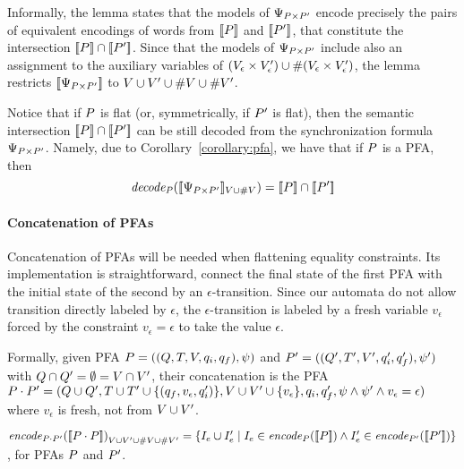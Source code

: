 \documentclass[sigplan,review,anonymous]{acmart}\settopmatter{printfolios=true,printccs=false,printacmref=false}
\begin{document}
Informally, the lemma states that the models of $\Psi_{P \times P'}$ encode precisely the pairs of equivalent encodings of words from $[\![P]\!]$ and $[\![P']\!]$, that constitute the intersection $[\![P]\!] \cap [\![P']\!]$. 
Since that the models of $\Psi_{P \times P'}$ include also an assignment to the auxiliary variables of $(V_\epsilon\times V'_\epsilon) \cup \#{(V_\epsilon\times V'_\epsilon)}$, the lemma restricts $[\![\Psi_{P \times P'}]\!]$ to ${V\cup V' \cup \#{V}\cup\#{V'}}$. 

Notice that if $P$ is flat (or, symmetrically, if $P'$ is flat), then the semantic intersection $[\![P]\!] \cap [\![P']\!]$ can be still decoded from the synchronization formula $\Psi_{P \times P'}$. 
Namely, due to Corollary~\ref{corollary:pfa}, we have that if $P$ is a PFA, then
$$
\mathit{decode_{P}} ([\![\Psi_{P \times P'}]\!]_{V\cup \#{V}}) = [\![P]\!] \cap [\![P']\!]
$$  

\paragraph{Concatenation of PFAs}
Concatenation of PFAs will be needed when flattening equality constraints. Its implementation is straightforward, connect the final state of the first PFA with the initial state of the second by an $\epsilon$-transition. Since our automata do not allow transition directly labeled by $\epsilon$, 
the $\epsilon$-transition is labeled by a fresh variable $v_\epsilon$ forced by the constraint $v_\epsilon = \epsilon$ to take the value $\epsilon$.  

Formally, given PFA $P = ((Q,T,V,q_i,q_f),\psi)$ and ${P'} = ((Q',T',V',q_i',q_f'),\psi')$ with $Q\cap Q'=\emptyset = V\cap V'$, 
their concatenation is the PFA $P\cdot P' = (Q\cup Q',T\cup T'\cup \{(q_f,v_\epsilon,q_i')\},V\cup V'\cup\{v_\epsilon\},q_i,q_f',\psi\land\psi'\land v_\epsilon = \epsilon)$ where $v_\epsilon$ is fresh, not from $V\cup V'$. 

\begin{lemma}
$\mathit{encode}_{P \cdot P'}{([\![P \cdot P]\!])}_{V\cup V' \cup \#{V}\cup\#{V'}} =
\{I_e \cup I_e'\mid I_e \in \mathit{encode}_{P} ([\![P]\!]) \wedge I_e' \in\mathit{encode}_{P'} ([\![P']\!])\}$, for PFAs $P$ and $P'$.
\end{lemma}
\end{document}
